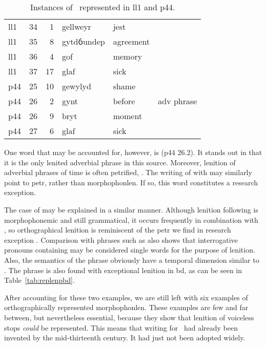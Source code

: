 \begin{table}[h]
  \centering
  \begin{tabular}{lddwql}
    \toprule
     &  &  &  &  &  \\
    \midrule
    \acrshort{ll1} & 34 & 1 & gellweyr & jest &  \\
    \acrshort{ll1} & 35 & 8 & gytdỽundep & agreement &  \\
    \acrshort{ll1} & 36 & 4 & gof & memory &  \\
    \acrshort{ll1} & 37 & 17 & glaf & sick &  \\
    \acrshort{p44} & 25 & 10 & gewylyd & shame &  \\
    \acrshort{p44} & 26 & 2 & gynt & before & adv phrase \\
    \acrshort{p44} & 26 & 9 & bryt & moment &  \\
    \acrshort{p44} & 27 & 6 & glaf & sick &  \\
    \bottomrule
  \end{tabular}%
  \caption{Instances of \lT\ represented in \acrshort{ll1} and \acrshort{p44}.}
  \label{tab:ltrepll1p44}
\end{table}

One word that may be accounted for, however, is  (\gls{p44} 26.2).
It stands out in that it is the only lenited adverbial phrase in this source.
Moreover, lenition of adverbial phrases of time is often petrified, \eg {}.
The writing of  with  may similarly point to \gls{petr}, rather than \gls{morphophonlen}.
If so, this word constitutes a research exception.

The case of  may be explained in a similar manner.
Although lenition following  is morphophonemic and still grammatical, it occurs frequently in combination with , so orthographical lenition is reminiscent of the \gls{petr} we find in research exception .
Comparison with phrases  such as  also shows that interrogative pronouns containing  may be considered single words for the purpose of lenition.
Also, the semantics of the phrase obviously have a temporal dimension similar to .
The phrase  is also found with exceptional lenition in \gls{bd}, as can be seen in Table~\ref{tab:replenpbd}.

After accounting for these two examples, we are still left with six examples of orthographically represented \gls{morphophonlen}.
These examples are few and far between, but nevertheless essential, because they show that lenition of voiceless stops \emph{could} be represented.
This means that writing  for \lT\ had already been invented by the mid-thirteenth century.
It had just not been adopted widely.


